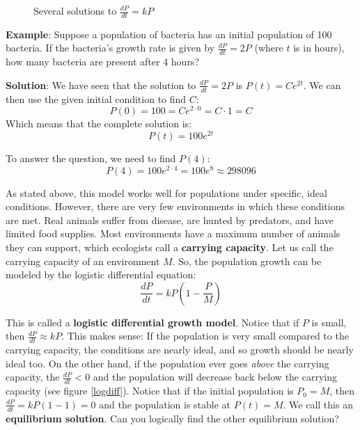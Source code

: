 \begin{figure}[htbp]
\centering
    \caption{Several solutions to $\frac{dP}{dt} = kP$}
    \label{expdiff}
\end{figure}


\textbf{Example}: Suppose a population of bacteria has an initial population 
of 100 bacteria. If the bacteria's growth rate is given by $\frac{dP}{dt} = 
2P$ (where $t$ is in hours), how many bacteria are present after 4 hours?

\textbf{Solution}: We have seen that the solution to $\frac{dP}{dt} = 2P$ is 
$P(t) = Ce^{2t}$. We can then use the given initial condition to find $C$:
$$P(0) = 100 = Ce^{2 \cdot 0} = C \cdot 1 = C$$
Which means that the complete solution is:
$$P(t) = 100 e^{2t}$$

To answer the question, we need to find $P(4)$:
$$P(4) = 100 e^{2 \cdot 4} = 100 e^{8} \approx 298096$$

As stated above, this model works well for populations under specific, ideal 
conditions. However, there are very few environments in which these conditions 
are met. Real animals suffer from disease, are hunted by predators, and have 
limited food supplies. Most environments have a maximum number of animals they 
can support, which ecologists call a \textbf{carrying capacity}. Let us call the carrying capacity of an environment $M$. So, the 
population growth can be modeled by the logistic differential equation: 
$$\frac{dP}{dt} = kP \left( 1 - \frac{P}{M} \right)$$

This is called a \textbf{logistic differential growth model}. Notice that if $P$ is small, then $\frac{dP}{dt} 
\approx kP$. This makes sense: If the population is very small compared to the 
carrying capacity, the conditions are nearly ideal, and so growth should be 
nearly ideal too. On the other hand, if the population ever goes \textit{
above} the carrying capacity, the $\frac{dP}{dt} < 0$ and the population will 
decrease back below the carrying capacity (see figure \ref{logdiff}). Notice 
that if the initial population is $P_0 = M$, then $\frac{dP}{dt} = kP \left( 1 
- 1 \right) = 0$ and the population is stable at $P(t) = M$. We call this an 
\textbf{equilibrium solution}. Can you logically 
find the other equilibrium solution? 

